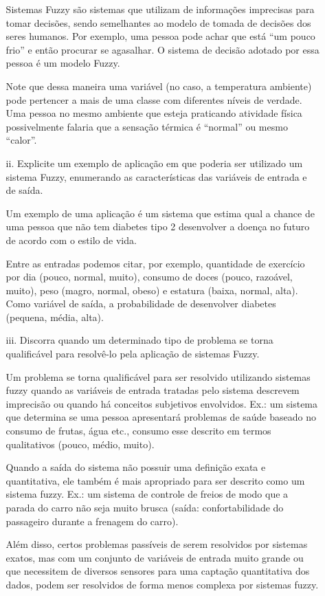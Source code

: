 \documentclass{report}
\begin{document}
\begin{enumerate}
\begin{enumerate}
Sistemas Fuzzy são sistemas que utilizam de informações imprecisas para tomar decisões, sendo semelhantes 
ao modelo de tomada de decisões dos seres humanos. Por exemplo, uma pessoa pode achar que está ``um pouco
frio'' e então procurar se agasalhar. O sistema de decisão adotado por essa pessoa é um modelo Fuzzy. 

Note que dessa maneira uma variável (no caso, a temperatura ambiente) 
pode pertencer a mais de uma classe com diferentes níveis de verdade. Uma pessoa no
mesmo ambiente que esteja praticando atividade física possivelmente falaria que a sensação térmica é ``normal'' ou mesmo
``calor''.

\item[ii.] Explicite um exemplo de aplicação em que poderia ser utilizado um sistema Fuzzy, 
enumerando as características das variáveis de entrada e de saída.

Um exemplo de uma aplicação é um sistema que estima qual a chance de uma pessoa que não tem diabetes tipo 2
desenvolver a doença no futuro de acordo com o estilo de vida. 

Entre as entradas podemos citar, por exemplo, quantidade 
de exercício por dia (pouco, normal, muito), consumo de doces (pouco, razoável, muito), peso (magro, normal, obeso) e 
estatura (baixa, normal, alta).  Como variável de saída, a probabilidade de desenvolver diabetes (pequena, média, alta).

\item[iii.] Discorra quando um determinado tipo de problema se torna qualificável para 
resolvê-lo pela aplicação de sistemas Fuzzy.

Um problema se torna qualificável para ser resolvido utilizando sistemas fuzzy quando as variáveis de entrada tratadas pelo sistema
descrevem imprecisão ou quando há conceitos subjetivos envolvidos. Ex.: um sistema que determina se uma pessoa apresentará problemas
de saúde baseado no consumo de frutas, água etc., consumo esse descrito em termos qualitativos (pouco, médio, muito).

Quando a saída do sistema não possuir uma definição
exata e quantitativa, ele também é mais apropriado para ser descrito como um sistema fuzzy.
Ex.: um sistema de controle de freios de modo que a parada do carro não seja muito brusca (saída: confortabilidade
do passageiro durante a frenagem do carro).

Além disso, certos problemas passíveis de serem resolvidos por sistemas exatos, mas com um conjunto de variáveis
de entrada muito grande ou que necessitem de diversos sensores para uma captação quantitativa dos dados,
podem ser resolvidos de forma menos complexa por sistemas fuzzy.

\end{enumerate}

\end{enumerate}
\end{document}
